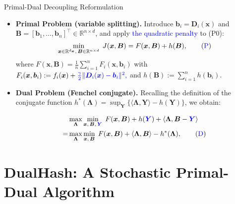 \documentclass[mathserif,compress,override,9pt]{beamer}
\numberwithin{equation}{section}
\newcommand{\RR}{\mathbb{R}}
\newcommand{\bx}{\bm{x}}
\newcommand{\bb}{\bm{b}}
\newcommand{\bD}{\bm{D}}
\newcommand{\bY}{\bm{Y}}
\newcommand{\bB}{\bm{B}}
\newcommand{\bLmbd}{\bm{\Lambda}}
\newcommand{\blue}[1]{\textcolor{blue}{#1}}
\theoremstyle{remark}
\begin{document}
\begin{frame}{Primal-Dual Decoupling Reformulation}
\vspace{0.1cm}
\begin{itemize}
\item[\blue{$\blacktriangleright$}] \textbf{Primal Problem (variable splitting).}
Introduce $\bb_i=\bD_i(\bx)$ and $\bB=[\bb_1,\ldots,\bb_n]^\top\in\RR^{n\times d}$, and apply \blue{the quadratic penalty} to (P0):
\begin{align}
\label{eq:primal}
\min_{\bx\in\RR^{d_{\bx}},\,\bB\in\RR^{n\times d}}\;
J(\bx,\bB)
=
F(\bx,\bB) + h(\bB), \tag{\blue{P}}
\end{align}
where $F(\bx,\bB)=\frac{1}{n}\sum_{i=1}^n F_i(\bx,\bb_i)$
with $F_i(\bx,\bb_i):=f_i(\bx)+\blue{\frac{\gamma}{2}\|\bD_i(\bx)-\bb_i\|^2,}$ 
and $h(\bB):=\sum_{i=1}^n h(\bb_i)$.
\vspace{0.3cm}

\item[\blue{$\blacktriangleright$}] \textbf{Dual Problem (Fenchel conjugate).}
Recalling the definition of the conjugate function
$h^*(\bLmbd)=\sup_{\bY}\{\langle\bLmbd,\bY\rangle-h(\bY)\}$, we obtain:

\begin{align}
&\max_{\bLmbd}\min_{\bx,\,\bB,\,\blue{\bY}}\;F(\bx,\bB)+h(\blue{\bY})+\langle\bLmbd,\bB-\blue{\bY}\rangle \notag\\
=& \max_{\bLmbd}\min_{\bx,\,\bB}\;F(\bx,\bB)+\langle\bLmbd,\bB\rangle - h^*(\bLmbd), \tag{\blue{D}}\label{eq:dual}
\end{align}
\end{itemize}
\end{frame}

\section{DualHash: A Stochastic Primal-Dual Algorithm}
\end{document}
